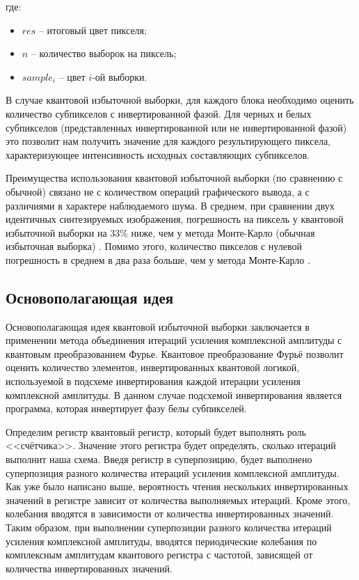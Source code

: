 где:

\begin{itemize}
	\item $res$ -- итоговый цвет пикселя;
	\item $n$ -- количество выборок на пиксель;
	\item $sample_{i}$ -- цвет $i$-ой выборки.
\end{itemize}

В случае квантовой избыточной выборки, для каждого блока необходимо оценить количество субпикселов с инвертированной фазой. Для черных и белых субпикселов (представленных инвертированной или не инвертированной фазой) это позволит нам получить значение для каждого результирующего пиксела, характеризующее интенсивность исходных составляющих субпикселов.

Преимущества использования квантовой избыточной выборки (по сравнению с обычной) связано не с количеством операций графического вывода, а с различиями в характере наблюдаемого шума. В среднем, при сравнении двух идентичных синтезируемых изображения, погрешность на пиксель у квантовой избыточной выборки на 33\% ниже, чем у метода Монте-Карло (обычная избыточная выборка) \cite{PQC}. Помимо этого, количество пикселов с нулевой погрешность в среднем в два раза больше, чем у метода Монте-Карло \cite{PQC}.

\subsection{Основополагающая идея}

Основополагающая идея квантовой избыточной выборки заключается в применении метода объединения итераций усиления комплексной амплитуды с квантовым преобразованием Фурье. Квантовое преобразование Фурьё позволит оценить количество элементов, инвертированных квантовой логикой, используемой в подсхеме инвертирования каждой итерации усиления комплексной амплитуды. В данном случае подсхемой инвертирования является программа, которая инвертирует фазу белы субпикселей.

Определим регистр квантовый регистр, который будет выполнять роль <<счётчика>>. Значение этого регистра будет определять, сколько итераций выполнит наша схема. Введя регистр в суперпозицию, будет выполнено суперпозиция разного количества итераций усиления комплексной амплитуды. Как уже было написано выше, вероятность чтения нескольких инвертированных значений в регистре зависит от количества выполняемых итераций. Кроме этого, колебания вводятся в зависимости от количества инвертированных значений. Таким образом, при выполнении суперпозиции разного количества итераций усиления комплексной амплитуды, вводятся периодические колебания по комплексным амплитудам квантового регистра с частотой, зависящей от количества инвертированных значений.

